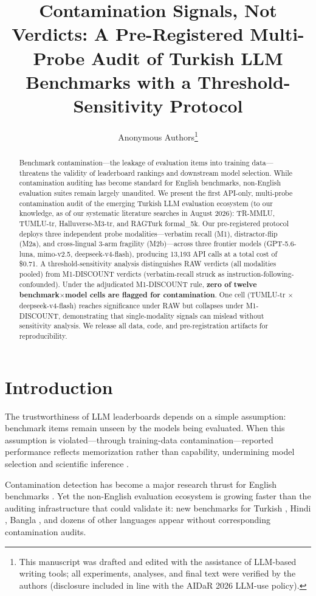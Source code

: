 \documentclass[letterpaper]{article}
\title{Contamination Signals, Not Verdicts: A Pre-Registered Multi-Probe Audit of Turkish LLM Benchmarks with a Threshold-Sensitivity Protocol}
\author{Anonymous Authors\thanks{This manuscript was drafted and edited with the assistance of LLM-based writing tools; all experiments, analyses, and final text were verified by the authors (disclosure included in line with the AIDaR 2026 LLM-use policy).}}
\date{}
\begin{document}
\maketitle
\begin{abstract}
Benchmark contamination---the leakage of evaluation items into training data---threatens the validity of leaderboard rankings and downstream model selection. While contamination auditing has become standard for English benchmarks, non-English evaluation suites remain largely unaudited. We present the first API-only, multi-probe contamination audit of the emerging Turkish LLM evaluation ecosystem (to our knowledge, as of our systematic literature searches in August 2026): TR-MMLU, TUMLU-tr, Halluverse-M3-tr, and RAGTurk formal\_5k. Our pre-registered protocol deploys three independent probe modalities---verbatim recall (M1), distractor-flip (M2a), and cross-lingual 3-arm fragility (M2b)---across three frontier models (GPT-5.6-luna, mimo-v2.5, deepseek-v4-flash), producing 13,193 API calls at a total cost of \$0.71. A threshold-sensitivity analysis distinguishes RAW verdicts (all modalities pooled) from M1-DISCOUNT verdicts (verbatim-recall struck as instruction-following-confounded). Under the adjudicated M1-DISCOUNT rule, \textbf{zero of twelve benchmark$\times$model cells are flagged for contamination}. One cell (TUMLU-tr $\times$ deepseek-v4-flash) reaches significance under RAW but collapses under M1-DISCOUNT, demonstrating that single-modality signals can mislead without sensitivity analysis. We release all data, code, and pre-registration artifacts for reproducibility.
\end{abstract}

\section{Introduction}
The trustworthiness of LLM leaderboards depends on a simple assumption: benchmark items remain unseen by the models being evaluated. When this assumption is violated---through training-data contamination---reported performance reflects memorization rather than capability, undermining model selection and scientific inference \cite{yang2024data,contammulti2024,constat2024}.

Contamination detection has become a major research thrust for English benchmarks \cite{geng2022detecting,riddell2024code,liang2024survey}. Yet the non-English evaluation ecosystem is growing faster than the auditing infrastructure that could validate it: new benchmarks for Turkish \cite{trmmu2024,tumlu2025}, Hindi \cite{indicmmlu2024}, Bangla \cite{mathshikkha2024}, and dozens of other languages appear without corresponding contamination audits.
\end{document}
